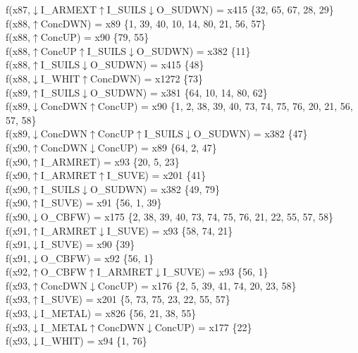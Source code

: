 f(x87,$\downarrow$I\_ARMEXT$\uparrow$I\_SUILS$\downarrow$O\_SUDWN) = x415 \{32, 65, 67, 28, 29\} \\  
f(x88,$\uparrow$ConcDWN) = x89 \{1, 39, 40, 10, 14, 80, 21, 56, 57\} \\  
f(x88,$\uparrow$ConcUP) = x90 \{79, 55\} \\  
f(x88,$\uparrow$ConcUP$\uparrow$I\_SUILS$\downarrow$O\_SUDWN) = x382 \{11\} \\  
f(x88,$\uparrow$I\_SUILS$\downarrow$O\_SUDWN) = x415 \{48\} \\  
f(x88,$\downarrow$I\_WHIT$\uparrow$ConcDWN) = x1272 \{73\} \\  
f(x89,$\uparrow$I\_SUILS$\downarrow$O\_SUDWN) = x381 \{64, 10, 14, 80, 62\} \\  
f(x89,$\downarrow$ConcDWN$\uparrow$ConcUP) = x90 \{1, 2, 38, 39, 40, 73, 74, 75, 76, 20, 21, 56, 57, 58\} \\  
f(x89,$\downarrow$ConcDWN$\uparrow$ConcUP$\uparrow$I\_SUILS$\downarrow$O\_SUDWN) = x382 \{47\} \\  
f(x90,$\uparrow$ConcDWN$\downarrow$ConcUP) = x89 \{64, 2, 47\} \\  
f(x90,$\uparrow$I\_ARMRET) = x93 \{20, 5, 23\} \\  
f(x90,$\uparrow$I\_ARMRET$\uparrow$I\_SUVE) = x201 \{41\} \\  
f(x90,$\uparrow$I\_SUILS$\downarrow$O\_SUDWN) = x382 \{49, 79\} \\  
f(x90,$\uparrow$I\_SUVE) = x91 \{56, 1, 39\} \\  
f(x90,$\downarrow$O\_CBFW) = x175 \{2, 38, 39, 40, 73, 74, 75, 76, 21, 22, 55, 57, 58\} \\  
f(x91,$\uparrow$I\_ARMRET$\downarrow$I\_SUVE) = x93 \{58, 74, 21\} \\  
f(x91,$\downarrow$I\_SUVE) = x90 \{39\} \\  
f(x91,$\downarrow$O\_CBFW) = x92 \{56, 1\} \\  
f(x92,$\uparrow$O\_CBFW$\uparrow$I\_ARMRET$\downarrow$I\_SUVE) = x93 \{56, 1\} \\  
f(x93,$\uparrow$ConcDWN$\downarrow$ConcUP) = x176 \{2, 5, 39, 41, 74, 20, 23, 58\} \\  
f(x93,$\uparrow$I\_SUVE) = x201 \{5, 73, 75, 23, 22, 55, 57\} \\  
f(x93,$\downarrow$I\_METAL) = x826 \{56, 21, 38, 55\} \\  
f(x93,$\downarrow$I\_METAL$\uparrow$ConcDWN$\downarrow$ConcUP) = x177 \{22\} \\  
f(x93,$\downarrow$I\_WHIT) = x94 \{1, 76\} \\  
